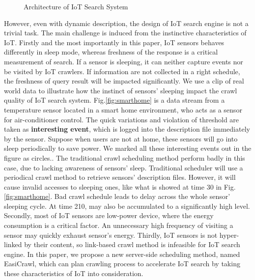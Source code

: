\documentclass[conference]{IEEEtran}
\begin{document}
\begin{figure}
	\vspace{0.5em}
	\centering
	\hspace{-3.0em}
	
	\captionsetup{justification=centering}
	\caption{Architecture of IoT Search System}
	\vspace{-1.0em}
	\label{fig:architecture}
\end{figure}

However, even with dynamic description, the design of IoT search engine is not a trivial task. The main challenge is induced from the instinctive characteristics of IoT. 
Firstly and the most importantly in this paper, IoT sensors behaves differently in sleep mode, whereas freshness of the response is a critical measurement of search. 
If a sensor is sleeping, it can neither capture events nor be visited by IoT crawlers. 
If information are not collected in a right schedule, the freshness of query result will be impacted significantly.
We use a clip of real world data to illustrate how the instinct of sensors' sleeping impact the crawl quality of IoT search system.
Fig.\ref{fig:smarthome} is a data stream from a temperature sensor located in a smart home environment, who acts as a sensor for air-conditioner control. 
The quick variations and violation of threshold are taken as \textbf{interesting event}, which is logged into the description file immediately by the sensor.
Suppose when users are not at home, these sensors will go into sleep periodically to save power.
We marked all these interesting events out in the figure as circles..
The traditional crawl scheduling method perform badly in this case, due to lacking awareness of sensors' sleep. 
Traditional scheduler will use a periodical crawl method to retrieve sensors' description files.
However, it will cause invalid accesses to sleeping ones, like what is showed at time 30 in Fig.\ref{fig:smarthome}. 
Bad crawl schedule leads to delay across the whole sensor' sleeping cycle. 
At time 210, may also be accumulated to a significantly high level. 
Secondly, most of IoT sensors are low-power device, where the energy consumption is a critical factor. 
An unnecessary high frequency of visiting a sensor may quickly exhaust sensor's energy.
Thirdly, IoT sensors is not hyper-linked by their content, so link-based crawl method is infeasible for IoT search engine. 
In this paper, we propose a new server-side scheduling method, named EasiCrawl, which can plan crawling process to accelerate IoT search by taking these characteristics of IoT into consideration.
\end{document}
